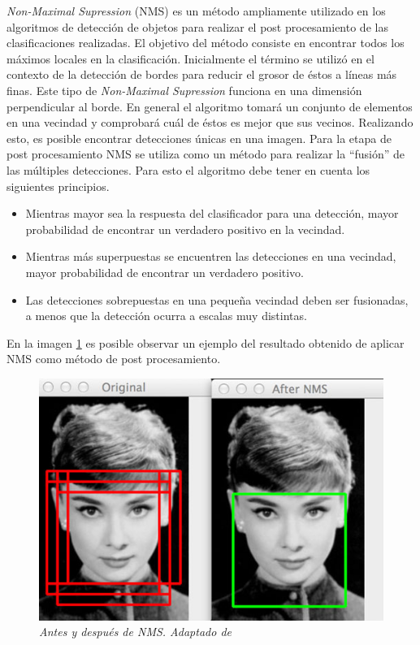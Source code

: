 \textit{Non-Maximal Supression} (NMS) es un método ampliamente utilizado en los algoritmos de detección de objetos para realizar el post procesamiento de las clasificaciones realizadas. El objetivo del método consiste en encontrar todos los máximos locales en la clasificación. Inicialmente el término se utilizó en el contexto de la detección de bordes para reducir el grosor de éstos a líneas más finas. Este tipo de \textit{Non-Maximal Supression} funciona en una dimensión perpendicular al borde. 
En general el algoritmo tomará un conjunto de elementos en una vecindad y comprobará cuál de éstos es mejor que sus vecinos. Realizando esto, es posible encontrar detecciones únicas en una imagen. Para la etapa de post procesamiento NMS se utiliza como un método para realizar la ``fusión'' de las múltiples detecciones. Para esto el algoritmo debe tener en cuenta los siguientes principios.

\begin{itemize}
\item Mientras mayor sea la respuesta del clasificador para una detección, mayor probabilidad de encontrar un verdadero positivo en la vecindad.
\item Mientras más superpuestas se encuentren las detecciones en una vecindad, mayor probabilidad de encontrar un verdadero positivo.
\item Las detecciones sobrepuestas en una pequeña vecindad deben ser fusionadas, a menos que la detección ocurra a escalas muy distintas.
\end{itemize}

En la imagen \ref{fig:nms} es posible observar un ejemplo del resultado obtenido de aplicar NMS como método de post procesamiento.

\begin{figure}[htc]
  \centering
  \includegraphics[scale=.3]{images/nms}
  \caption{\em Antes y después de NMS. Adaptado de \cite{Rosebrock2014}} 
  \label{fig:nms}
\end{figure}


